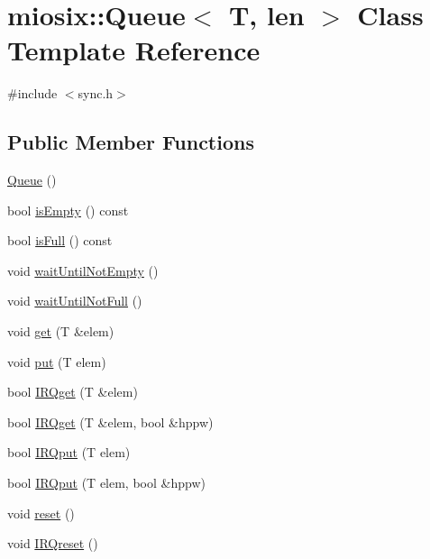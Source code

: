 \hypertarget{classmiosix_1_1_queue}{\section{miosix\-:\-:Queue$<$ T, len $>$ Class Template Reference}
\label{classmiosix_1_1_queue}
}


{\ttfamily \#include $<$sync.\-h$>$}

\subsection*{Public Member Functions}
\begin{DoxyCompactItemize}
\item 
\hyperlink{classmiosix_1_1_queue_a45ac6bfe191bc6d52089215b52863732}{Queue} ()
\item 
bool \hyperlink{classmiosix_1_1_queue_a8d18f593639d0d7eef52b6267f83ce34}{is\-Empty} () const 
\item 
bool \hyperlink{classmiosix_1_1_queue_affa922a8101a173168daca418eed8c4b}{is\-Full} () const 
\item 
void \hyperlink{classmiosix_1_1_queue_af77abf62e5999b15fa5fcb3101f4801d}{wait\-Until\-Not\-Empty} ()
\item 
void \hyperlink{classmiosix_1_1_queue_af3809d4c8d0ae31774ca5e985b1810e5}{wait\-Until\-Not\-Full} ()
\item 
void \hyperlink{classmiosix_1_1_queue_ade3ad87c4c3fdac0a2bdd755ff3c8971}{get} (T \&elem)
\item 
void \hyperlink{classmiosix_1_1_queue_a40eac0f03500a45a6ec3a5af3e0909be}{put} (T elem)
\item 
bool \hyperlink{classmiosix_1_1_queue_a545ed38e44e319303e0d657de8195cec}{I\-R\-Qget} (T \&elem)
\item 
bool \hyperlink{classmiosix_1_1_queue_a2875b9df92f6a5db148b3e4f7ad989bf}{I\-R\-Qget} (T \&elem, bool \&hppw)
\item 
bool \hyperlink{classmiosix_1_1_queue_aebf1e9ff8643933b679b5d6e2ecfe343}{I\-R\-Qput} (T elem)
\item 
bool \hyperlink{classmiosix_1_1_queue_a8a0fd6d06459b6a2c72ed07afaad76fd}{I\-R\-Qput} (T elem, bool \&hppw)
\item 
void \hyperlink{classmiosix_1_1_queue_a36d52ae7f77126add31096faa97e45b0}{reset} ()
\item 
void \hyperlink{classmiosix_1_1_queue_a8d7aea4c62e78d4221dbaab13538e695}{I\-R\-Qreset} ()
\end{DoxyCompactItemize}
